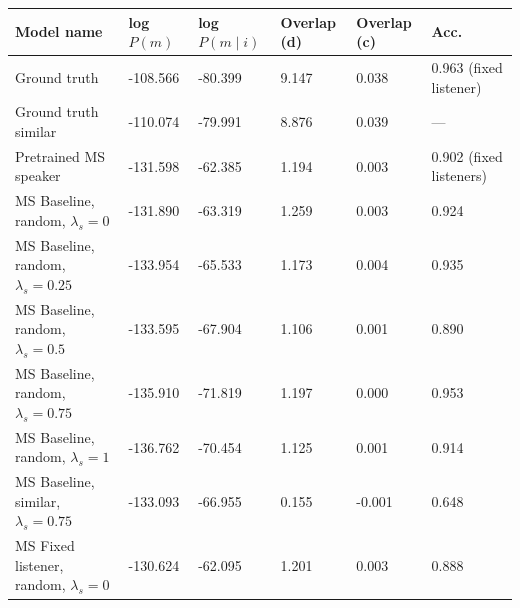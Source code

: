 \begin{table}[]
	\begin{tabularx}{\textwidth}{|X|l|l|X|X|X|}
		\hline
		\textbf{Model name}                                    & \textbf{log $P(m)$} & \textbf{log $P(m \mid i)$} & \textbf{Overlap (d)} & \textbf{Overlap (c)} & \textbf{Acc. } \\ \hline
		Ground truth               &     -108.566            &          -80.399             &    9.147           &       0.038          &  0.963 (fixed listener)                  \\ \hline
		Ground truth similar               &     -110.074        &       -79.991           &           8.876  &   0.039        &      ---         \\ \hline
		Pretrained MS speaker               &      -131.598            &           -62.385             &          1.194            &           0.003           & 0.902 (fixed listeners)                 \\ \hline
		MS Baseline, random, $\lambda_s = 0$      &     -131.890              &         -63.319               &        1.259       &         0.003             &             0.924                        \\ \hline
		MS Baseline, random, $\lambda_s = 0.25$    &      -133.954             &          -65.533              &          1.173            &       0.004               &           0.935               \\ \hline
		MS Baseline, random, $\lambda_s = 0.5$      &         -133.595         &           -67.904             &        1.106              &        0.001              &             0.890                 \\ \hline
		MS Baseline, random, $\lambda_s = 0.75$   &       -135.910            &             -71.819          &        1.197              &        0.000              & 0.953                \\ \hline
		MS Baseline, random, $\lambda_s =1$  &      -136.762             &          -70.454              &         1.125             &          0.001            &                   0.914         \\ \hline
		MS Baseline, similar, $\lambda_s = 0.75$  &     -133.093              &       -66.955                &               0.155       &       -0.001               &        0.648            \\ \hline
		MS Fixed listener, random, $\lambda_s = 0$  &         -130.624         &           -62.095             &     1.201                 &        0.003              &                          0.888               \\ \hline

\end{tabularx}
\end{table}
